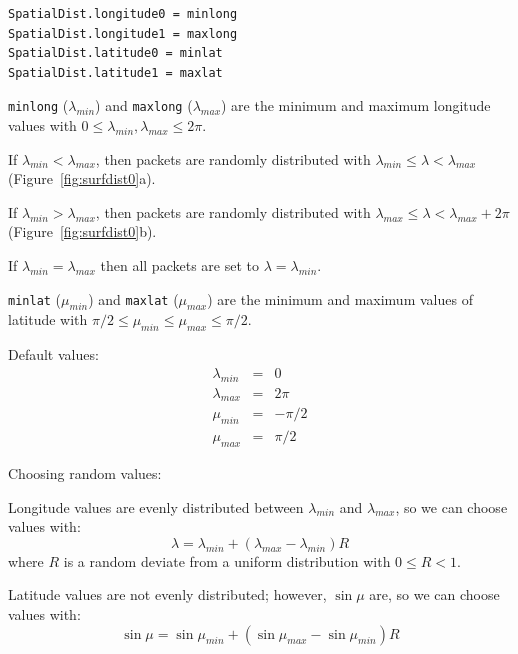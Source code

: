 \documentclass[11pt]{article}
\begin{document}
\begin{compactenum}
\begin{compactenum}
\begin{verbatim}
SpatialDist.longitude0 = minlong
SpatialDist.longitude1 = maxlong
SpatialDist.latitude0 = minlat
SpatialDist.latitude1 = maxlat
  \end{verbatim}
  \item \texttt{minlong} ($\lambda_{min}$) and \texttt{maxlong}
  ($\lambda_{max}$) are the minimum and maximum longitude values with 
  $0 \leq \lambda_{min},\lambda_{max} \leq 2\pi$.
    \begin{compactitem}
    \item If $\lambda_{min} < \lambda_{max}$, then packets are randomly
    distributed with $\lambda_{min} \leq \lambda < \lambda_{max}$
    (Figure~\ref{fig:surfdist0}a).
    \item If $\lambda_{min} > \lambda_{max}$, then packets are randomly
    distributed with $\lambda_{max} \leq \lambda < \lambda_{max}+2\pi$
    (Figure~\ref{fig:surfdist0}b).
    \item If $\lambda_{min} = \lambda_{max}$ then all packets are set to
    $\lambda = \lambda_{min}$.
    \end{compactitem}
  \item \texttt{minlat} ($\mu_{min}$) and \texttt{maxlat} ($\mu_{max}$) are the
  minimum and maximum values of latitude with $\pi/2 \leq \mu_{min} \leq 
  \mu_{max} \leq \pi/2$.
  \item Default values:
    \begin{eqnarray*}
    \lambda_{min} & = & 0 \\
    \lambda_{max} & = & 2\pi \\
    \mu_{min} & = & -\pi/2 \\
    \mu_{max} & = & \pi/2 
    \end{eqnarray*}
  \end{compactenum}
\item Choosing random values:
  \begin{compactenum}
  \item Longitude values are evenly distributed between $\lambda_{min}$ and
  $\lambda_{max}$, so we can choose values with: 
    \begin{equation}
    \lambda = \lambda_{min} + (\lambda_{max}-\lambda_{min}) R
    \end{equation}
    where $R$ is a random deviate from a uniform distribution with $0 \leq R <
    1$.
  \item Latitude values are not evenly distributed; however, $\sin \mu$ are, so
  we can choose values with:
    \begin{equation}
    \sin \mu = \sin \mu_{min} + (\sin \mu_{max}-\sin \mu_{min}) R 

\end{equation}
\end{compactenum}
\end{compactenum}
\end{document}
